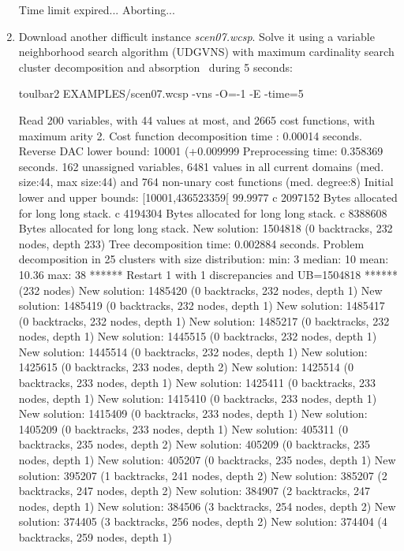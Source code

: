 \begin{enumerate}
{\begin{DoxyCode}
Time limit expired... Aborting...
\end{DoxyCode}}
\item Download another difficult instance {\em scen07.wcsp}. Solve it using a variable neighborhood search algorithm (UDGVNS) with maximum cardinality search cluster decomposition and absorption~\cite{Ouali17} during 5 seconds:
\begin{DoxyCode}
	toulbar2 EXAMPLES/scen07.wcsp -vns -O=-1 -E -time=5
\end{DoxyCode}
{\scriptsize
\begin{DoxyCode}
Read 200 variables, with 44 values at most, and 2665 cost functions, with maximum arity 2.
Cost function decomposition time : 0.00014 seconds.
Reverse DAC lower bound: 10001 (+0.009999%
Preprocessing time: 0.358369 seconds.
162 unassigned variables, 6481 values in all current domains (med. size:44, max size:44) and 764 non-unary cost functions (med. degree:8)
Initial lower and upper bounds: [10001,436523359[ 99.9977%
c 2097152 Bytes allocated for long long stack.
c 4194304 Bytes allocated for long long stack.
c 8388608 Bytes allocated for long long stack.
New solution: 1504818 (0 backtracks, 232 nodes, depth 233)
Tree decomposition time: 0.002884 seconds.
Problem decomposition in 25 clusters with size distribution: min: 3 median: 10 mean: 10.36 max: 38
****** Restart 1 with 1 discrepancies and UB=1504818 ****** (232 nodes)
New solution: 1485420 (0 backtracks, 232 nodes, depth 1)
New solution: 1485419 (0 backtracks, 232 nodes, depth 1)
New solution: 1485417 (0 backtracks, 232 nodes, depth 1)
New solution: 1485217 (0 backtracks, 232 nodes, depth 1)
New solution: 1445515 (0 backtracks, 232 nodes, depth 1)
New solution: 1445514 (0 backtracks, 232 nodes, depth 1)
New solution: 1425615 (0 backtracks, 233 nodes, depth 2)
New solution: 1425514 (0 backtracks, 233 nodes, depth 1)
New solution: 1425411 (0 backtracks, 233 nodes, depth 1)
New solution: 1415410 (0 backtracks, 233 nodes, depth 1)
New solution: 1415409 (0 backtracks, 233 nodes, depth 1)
New solution: 1405209 (0 backtracks, 233 nodes, depth 1)
New solution: 405311 (0 backtracks, 235 nodes, depth 2)
New solution: 405209 (0 backtracks, 235 nodes, depth 1)
New solution: 405207 (0 backtracks, 235 nodes, depth 1)
New solution: 395207 (1 backtracks, 241 nodes, depth 2)
New solution: 385207 (2 backtracks, 247 nodes, depth 2)
New solution: 384907 (2 backtracks, 247 nodes, depth 1)
New solution: 384506 (3 backtracks, 254 nodes, depth 2)
New solution: 374405 (3 backtracks, 256 nodes, depth 2)
New solution: 374404 (4 backtracks, 259 nodes, depth 1)

\end{DoxyCode}}
\end{enumerate}
